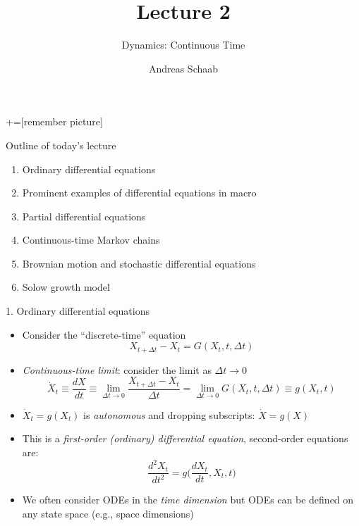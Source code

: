 \documentclass[10pt]{beamer}
\title{\large Lecture 2}
\subtitle{Dynamics: Continuous Time}
\author{Andreas Schaab}
\date{}
\begin{document}
+=[remember picture]
\thispagestyle{empty}
\maketitle 
\newpage

\addtocounter{framenumber}{-1}


\begin{frame}{Outline of today's lecture}
\addtocounter{framenumber}{-1}
\begin{enumerate}
\item Ordinary differential equations
\item Prominent examples of differential equations in macro
\item Partial differential equations
\item Continuous-time Markov chains
\item Brownian motion and stochastic differential equations
\item Solow growth model
\end{enumerate}
\end{frame}



\begin{frame}{1. Ordinary differential equations}
\begin{itemize}
\item Consider the ``discrete-time'' equation 
\begin{equation*}
	X_{t+\Delta t} - X_t = G(X_t, t, \Delta t)
\end{equation*}

\item \textit{Continuous-time limit}: consider the limit as $\Delta t \to 0$
\begin{equation*}
	\dot X_t \equiv \frac{dX}{dt} \equiv \lim_{\Delta t \to 0} \frac{X_{t+\Delta t} - X_t}{\Delta t} = \lim_{\Delta t \to 0} G(X_t, t, \Delta t) \equiv g(X_t, t)
\end{equation*}

\item $\dot X_t = g(X_t)$ is \textit{autonomous} and dropping subscripts: $\dot X = g(X)$

\item This is a \textit{first-order (ordinary) differential equation}, second-order equations are:
\begin{equation*}
	\frac{d^2 X_t}{dt^2} = g \bigg( \frac{dX_t}{dt} , X_t, t \bigg)
\end{equation*}

\item We often consider ODEs in the \textit{time dimension} but ODEs can be defined on any state space (e.g., space dimensions)

\end{itemize}
\end{frame}
\end{document}

